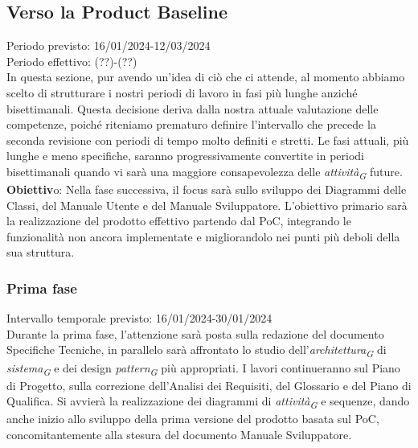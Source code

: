 \subsection{Verso la Product Baseline}
Periodo previsto: 16/01/2024-12/03/2024\\ 
\vspace{0.2cm} 
Periodo effettivo: (??)-(??)\\ 
\vspace{0.2cm} 
In questa sezione, pur avendo un'idea di ciò che ci attende, al momento abbiamo scelto di strutturare i nostri periodi di lavoro in fasi più lunghe anziché bisettimanali. Questa decisione deriva dalla nostra attuale valutazione delle competenze, poiché riteniamo prematuro definire l'intervallo che precede la seconda revisione con periodi di tempo molto definiti e stretti. 
Le fasi attuali, più lunghe e meno specifiche, saranno progressivamente convertite in periodi bisettimanali quando vi sarà una maggiore consapevolezza delle \textit{attività}\textsubscript{\textit{G}} future.
\\ 
\vspace{0.2cm} 
\textbf{Obiettiv}o: Nella fase successiva, il focus sarà sullo sviluppo dei Diagrammi delle Classi, del Manuale Utente e del Manuale Sviluppatore. L'obiettivo primario sarà la realizzazione del prodotto effettivo partendo dal PoC, integrando le funzionalità non ancora implementate e migliorandolo nei punti più deboli della sua struttura.\\ 
\vspace{0.2cm} 

\subsubsection{Prima fase}
Intervallo temporale previsto: 16/01/2024-30/01/2024\\ 
\vspace{0.2cm} 
Durante la prima fase, l'attenzione sarà posta sulla redazione del documento Specifiche Tecniche, in parallelo sarà affrontato lo studio dell'\textit{architettura}\textsubscript{\textit{G}} di \textit{sistema}\textsubscript{\textit{G}} e dei design \textit{pattern}\textsubscript{\textit{G}} più appropriati. I lavori continueranno sul Piano di Progetto, sulla correzione dell'Analisi dei Requisiti, del Glossario e del Piano di Qualifica. Si avvierà la realizzazione dei diagrammi di \textit{attività}\textsubscript{\textit{G}} e sequenze, dando anche inizio allo sviluppo della prima versione del prodotto basata sul PoC, concomitantemente alla stesura del documento Manuale Sviluppatore.

